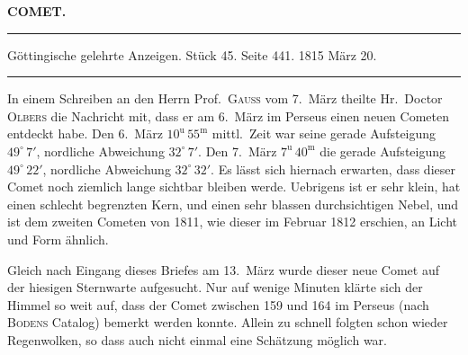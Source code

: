 \clearpage{}
\begin{center}\textbf{COMET.}\par\vspace{4pt}\hrule\vspace{4pt}\fontsize{10}{12}\selectfont Göttingische gelehrte Anzeigen. Stück 45. Seite 441. 1815 März 20.\par\vspace{4pt}\hrule\vspace{4pt}\end{center}

\par\indent In einem Schreiben an den Herrn Prof.\ \textsc{Gauss} vom 7.\ März theilte Hr.\ Doctor \textsc{Olbers} die Nachricht mit, dass er am 6.\ März im Perseus einen neuen Cometen entdeckt habe. Den 6.\ März $10^{\mathrm u}\,55^{\mathrm m}$ mittl.\ Zeit war seine gerade Aufsteigung $49^\circ\,7'$, nordliche Abweichung $32^\circ\,7'$. Den 7.\ März $7^{\mathrm u}\,40^{\mathrm m}$ die gerade Aufsteigung $49^\circ\,22'$, nordliche Abweichung $32^\circ\,32'$. Es lässt sich hiernach erwarten, dass dieser Comet noch ziemlich lange sichtbar bleiben werde. Uebrigens ist er sehr klein, hat einen schlecht begrenzten Kern, und einen sehr blassen durchsichtigen Nebel, und ist dem zweiten Cometen von 1811, wie dieser im Februar 1812 erschien, an Licht und Form ähnlich.

\par\indent Gleich nach Eingang dieses Briefes am 13.\ März wurde dieser neue Comet auf der hiesigen Sternwarte aufgesucht. Nur auf wenige Minuten klärte sich der Himmel so weit auf, dass der Comet zwischen 159 und 164 im Perseus (nach \textsc{Bodens} Catalog) bemerkt werden konnte. Allein zu schnell folgten schon wieder Regenwolken, so dass auch nicht einmal eine Schätzung möglich war.
